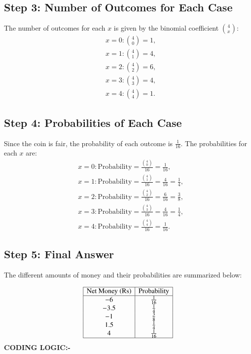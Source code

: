 \documentclass[journal]{IEEEtran}
\numberwithin{equation}{enumi}
\numberwithin{figure}{enumi}
\begin{document}
\subsection*{Step 3: Number of Outcomes for Each Case}

The number of outcomes for each \( x \) is given by the binomial coefficient \( \binom{4}{x} \):
\[
\begin{aligned}
    &x = 0: \binom{4}{0} = 1, \\
    &x = 1: \binom{4}{1} = 4, \\
    &x = 2: \binom{4}{2} = 6, \\
    &x = 3: \binom{4}{3} = 4, \\
    &x = 4: \binom{4}{4} = 1.
\end{aligned}
\]

\subsection*{Step 4: Probabilities of Each Case}

Since the coin is fair, the probability of each outcome is \( \frac{1}{16} \). The probabilities for each \( x \) are:
\[
\begin{aligned}
    &x = 0: \text{Probability} = \frac{\binom{4}{0}}{16} = \frac{1}{16}, \\
    &x = 1: \text{Probability} = \frac{\binom{4}{1}}{16} = \frac{4}{16} = \frac{1}{4}, \\
    &x = 2: \text{Probability} = \frac{\binom{4}{2}}{16} = \frac{6}{16} = \frac{3}{8}, \\
    &x = 3: \text{Probability} = \frac{\binom{4}{3}}{16} = \frac{4}{16} = \frac{1}{4}, \\
    &x = 4: \text{Probability} = \frac{\binom{4}{4}}{16} = \frac{1}{16}.
\end{aligned}
\]

\subsection*{Step 5: Final Answer}

The different amounts of money and their probabilities are summarized below:

\[
\begin{array}{|c|c|}
\hline
\text{Net Money (Rs)} & \text{Probability} \\
\hline
-6 & \frac{1}{16} \\
-3.5 & \frac{1}{4} \\
-1 & \frac{3}{8} \\
1.5 & \frac{1}{4} \\
4 & \frac{1}{16} \\
\hline
\end{array}
\]
\textbf{CODING LOGIC:-}
\end{document}
